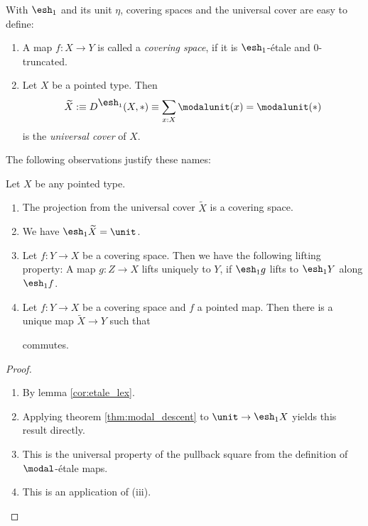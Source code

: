 \documentclass{msc}
\newcommand{\shape}{\ensuremath{\mathord{\raisebox{0.5pt}{\text{\rm\esh}}}}}
\begin{document}
With $\shape_1$ and its unit $\eta$, covering spaces and the universal cover are easy to define:
\begin{defn}
  \begin{enumerate}
  \item A map $f:X\to Y$ is called a \emph{covering space}, if it is $\shape_1$-étale and $0$-truncated.
  \item Let $X$ be a pointed type. Then
    \[ \widetilde{X}:\equiv D^{\shape_1}(X,\ast)\equiv\sum_{x:X}\modalunit(x)=\modalunit(\ast) \]
    is the \emph{universal cover} of $X$.
  \end{enumerate}

\end{defn}
The following observations justify these names:
\begin{rmk}
  Let $X$ be any pointed type.
  \begin{enumerate}
  \item The projection from the universal cover $\widetilde{X}$ is a covering space.
  \item We have $\shape_1 \widetilde{X} = \unit$.
  \item Let $f:Y\to X$ be a covering space. Then we have the following lifting property:
    A map $g:Z\to X$ lifts uniquely to $Y$, if $\shape_1 g$ lifts to $\shape_1 Y$ along $\shape_1 f$.
  \item Let $f:Y\to X$ be a covering space and $f$ a pointed map. Then there is a unique map $\widetilde{X}\to Y$ such that
    \begin{center}
    \end{center}
    commutes.
  \end{enumerate}
\end{rmk}
\begin{proof}
  \begin{enumerate}
  \item By lemma \ref{cor:etale_lex}. 
  \item Applying theorem \ref{thm:modal_descent} to $\unit\to \shape_1 X$ yields this result directly.
  \item This is the universal property of the pullback square from the definition of $\modal$-étale maps.
  \item This is an application of (iii).\qedhere
  \end{enumerate}
\end{proof}
\end{document}
